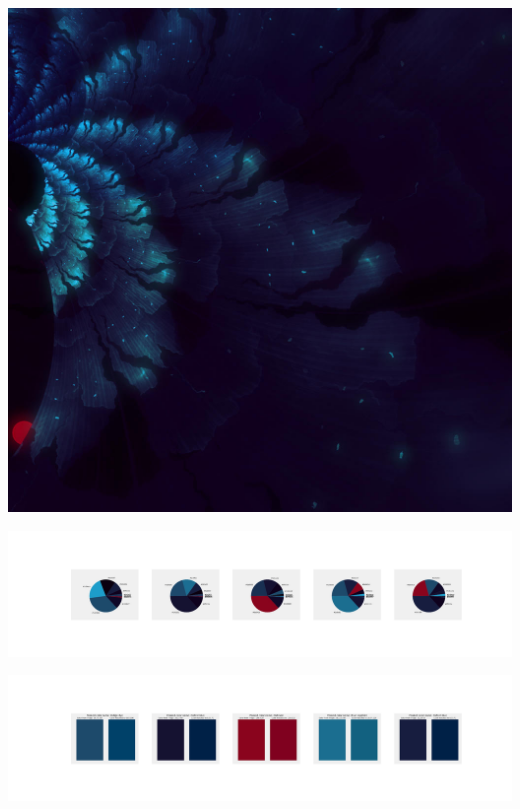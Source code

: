 \documentclass[11pt]{article}
\begin{document}
\begin{landscape}
    \begin{center}
    \includegraphics[width=\textwidth]{./nbimg/file (416).jpg}
    \end{center}

    \begin{center}
    \includegraphics[width=250mm]{./nbimg/pie-352.jpg}
    \end{center}

    \begin{center}
    \includegraphics[width=250mm]{./nbimg/peak-352.jpg}
    \end{center}
    


\end{landscape}
\end{document}
